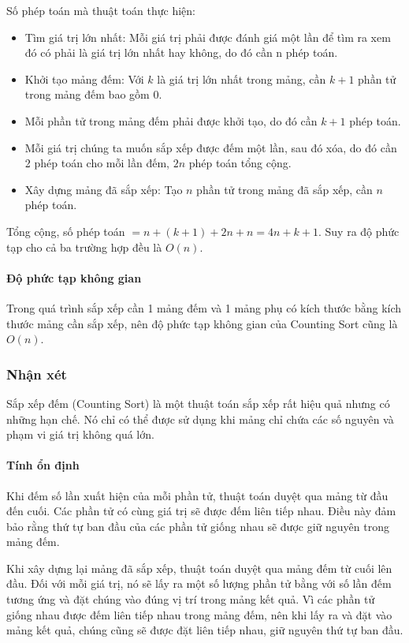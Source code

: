 Số phép toán mà thuật toán thực hiện:
\begin{itemize}
    \item Tìm giá trị lớn nhất: Mỗi giá trị phải được đánh giá một lần để tìm ra xem đó có phải là giá trị lớn nhất hay không, do đó cần n phép toán. 
    \item Khởi tạo mảng đếm: Với $k$ là giá trị lớn nhất trong mảng, cần $k + 1$ phần tử trong mảng đếm bao gồm 0. 
    \item Mỗi phần tử trong mảng đếm phải được khởi tạo, do đó cần $k + 1$ phép toán. 
    \item Mỗi giá trị chúng ta muốn sắp xếp được đếm một lần, sau đó xóa, do đó cần 2 phép toán cho mỗi lần đếm, $2n$ phép toán tổng cộng. 
    \item Xây dựng mảng đã sắp xếp: Tạo $n$ phần tử trong mảng đã sắp xếp, cần $n$ phép toán. 

\end{itemize}
Tổng cộng, số phép toán $= n + (k + 1) + 2n + n = 4n + k + 1$. Suy ra độ
phức tạp cho cả ba trường hợp đều là $O(n)$.


\paragraph{Độ phức tạp không gian}
Trong quá trình sắp xếp cần 1 mảng đếm và 1 mảng phụ có kích thước bằng kích thước mảng cần sắp xếp, nên độ phức tạp không gian của Counting Sort cũng là $O(n)$.



\subsubsection{Nhận xét}

Sắp xếp đếm (Counting Sort) là một thuật toán sắp xếp rất hiệu quả nhưng có những hạn chế. Nó chỉ có thể được sử dụng khi mảng chỉ chứa các số nguyên và phạm vi giá trị không quá lớn. 
\paragraph{Tính ổn định}
Khi đếm số lần xuất hiện của mỗi phần tử, thuật toán duyệt qua mảng từ đầu đến cuối. Các phần tử có cùng giá trị sẽ được đếm liên tiếp nhau. Điều này đảm bảo rằng thứ tự ban đầu của các phần tử giống nhau sẽ được giữ nguyên trong mảng đếm.

Khi xây dựng lại mảng đã sắp xếp, thuật toán duyệt qua mảng đếm từ cuối lên đầu. Đối với mỗi giá trị, nó sẽ lấy ra một số lượng phần tử bằng với số lần đếm tương ứng và đặt chúng vào đúng vị trí trong mảng kết quả. Vì các phần tử giống nhau được đếm liên tiếp nhau trong mảng đếm, nên khi lấy ra và đặt vào mảng kết quả, chúng cũng sẽ được đặt liên tiếp nhau, giữ nguyên thứ tự ban đầu.

